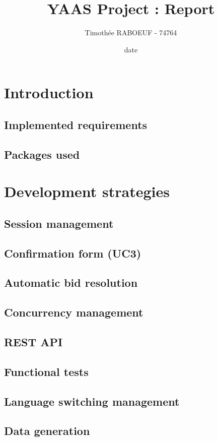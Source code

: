 \documentclass[a4paper, 11pt]{report}
\title{YAAS Project : Report}
\author{Timothée RABOEUF - 74764}
\date{date}
\begin{document}
 
\maketitle
\tableofcontents
    
\chapter{Introduction}

    \section{Implemented requirements}

    \section{Packages used}

\chapter{Development strategies}

    \section{Session management}

    \section{Confirmation form (UC3)}

    \section{Automatic bid resolution}
        
    \section{Concurrency management}

    \section{REST API}

    \section{Functional tests}

    \section{Language switching management}

    \section{Data generation}
\end{document}
